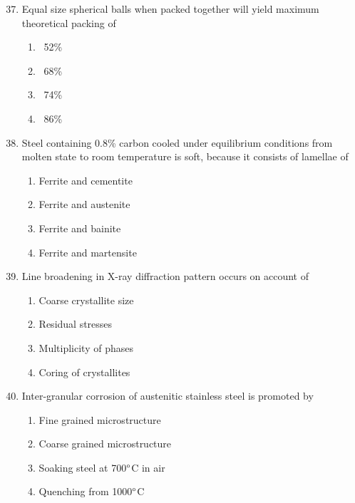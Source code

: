 \documentclass[journal,9pt,onecolumn]{IEEEtran}
\begin{document}
\begin{enumerate}

\setcounter{enumi}{36}
\item Equal size spherical balls when packed together will yield maximum theoretical packing of
\begin{multicols}{4}    
\begin{enumerate}
     \item ~52\%
     \item ~68\%
     \item ~74\%
     \item ~86\%
\end{enumerate}
\end{multicols}

\item Steel containing 0.8\% carbon cooled under equilibrium conditions from molten state to room
temperature is soft, because it consists of lamellae of
\begin{multicols}{2}
\begin{enumerate}
    \item Ferrite and cementite
    \item Ferrite and austenite
    \item Ferrite and bainite
    \item Ferrite and martensite
\end{enumerate}
\end{multicols}


\item  Line broadening in X-ray diffraction pattern occurs on account of
\begin{multicols}{2}
\begin{enumerate}
    \item Coarse crystallite size
    \item Residual stresses
    \item Multiplicity of phases
    \item Coring of crystallites
    \end{enumerate}
\end{multicols}


\item  Inter-granular corrosion of austenitic stainless steel is promoted by
\begin{multicols}{2}    
\begin{enumerate}
    \item Fine grained microstructure 
    \item Coarse grained microstructure
    \item Soaking steel at 700$\degree$C in air
    \item Quenching from 1000$\degree$C
\end{enumerate}
\end{multicols}



\end{enumerate}
\end{document}
